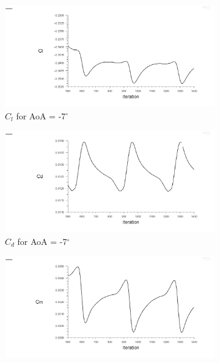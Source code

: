 \begin{figure}[H]
  \begin{subfigure}[b]{0.5\textwidth}
    \includegraphics[width=\textwidth]{-7_deg/AoA_-7_cl.png}
    \caption{$C_l$ for AoA = -7$^\circ$}
    \label{fig:aoa_-7_cl}
  \end{subfigure}
  \hfill
  \begin{subfigure}[b]{0.5\textwidth}
    \includegraphics[width=\textwidth]{-7_deg/AoA_-7_cd.png}
    \caption{$C_d$ for AoA = -7$^\circ$}
    \label{fig:aoa_-7_cd}
  \end{subfigure}
  \begin{subfigure}[b]{0.5\textwidth}
    \includegraphics[width=\textwidth]{-7_deg/AoA_-7_cm.png}

\end{subfigure}
\end{figure}
